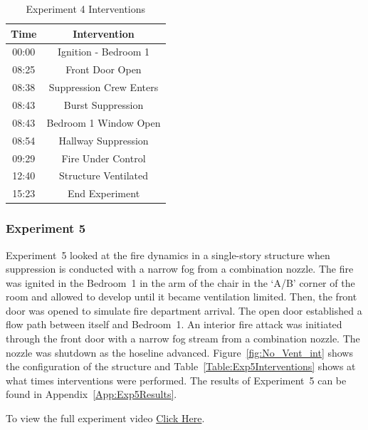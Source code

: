 \documentclass[12pt,oneside]{book}
\begin{document}
\begin{table}[!ht]
	\centering
	\caption{Experiment 4 Interventions}
	\begin{tabular}{|c|c|} 
		\hline
		Time & Intervention \\ \hline \hline
		00:00 & Ignition - Bedroom 1 \\ \hline
		08:25 & Front Door Open \\ \hline
		08:38 & Suppression Crew Enters\\ \hline
		08:43 & Burst Suppression \\ \hline
		08:43 & Bedroom 1 Window Open \\ \hline 
		08:54 & Hallway Suppression \\ \hline
		09:29 & Fire Under Control \\ \hline
		12:40 & Structure Ventilated \\ \hline
		15:23 & End Experiment\\ \hline
	\end{tabular}
	\label{Table:Exp4Interventions}
\end{table}

\FloatBarrier
\clearpage

\subsubsection{Experiment 5}
Experiment~5 looked at the fire dynamics in a single-story structure when suppression is conducted with a narrow fog from a combination nozzle. The fire was ignited in the Bedroom~1 in the arm of the chair in the `A/B' corner of the room and allowed to develop until it became ventilation limited. Then, the front door was opened to simulate fire department arrival. The open door established a flow path between itself and Bedroom~1. An interior fire attack was initiated through the front door with a narrow fog stream from a combination nozzle. The nozzle was shutdown as the hoseline advanced. Figure~\ref{fig:No_Vent_int} shows the configuration of the structure and Table~\ref{Table:Exp5Interventions} shows at what times interventions were performed. The results of Experiment~5 can be found in Appendix~\ref{App:Exp5Results}. 

To view the full experiment video \href{https://player.vimeo.com/video/170511425?autoplay=1}{Click Here}.
\end{document}
